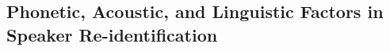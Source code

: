 \documentclass[12pt,leqno,a4paper]{article}
\begin{document}







\subsection{Phonetic, Acoustic, and Linguistic Factors in Speaker Re-identification}
\label{subsec:phonetic_acoustic_linguistic_factors}
\end{document}
